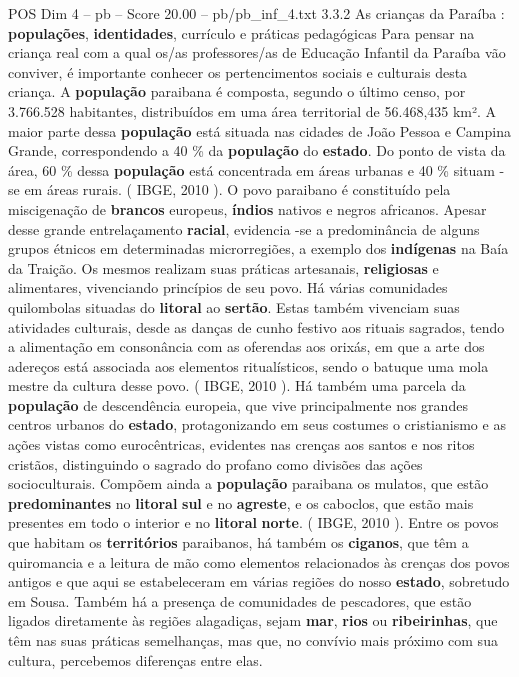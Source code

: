 \begin{textsample}{POS Dim 4 – pb – Score 20.00 – pb/pb\_inf\_4.txt}  \label{ex:f4_pos_261}
3.3.2 As crianças da Paraíba : \textbf{populações}, \textbf{identidades}, currículo e práticas pedagógicas Para pensar na criança real com a qual os/as professores/as de Educação Infantil da Paraíba vão conviver, é importante conhecer os pertencimentos sociais e culturais desta criança.
A \textbf{população} paraibana é composta, segundo o último censo, por 3.766.528 habitantes, distribuídos em uma área territorial de 56.468,435 km².
A maior parte dessa \textbf{população} está situada nas cidades de João Pessoa e Campina Grande, correspondendo a 40 \% da \textbf{população} do \textbf{estado}.
Do ponto de vista da área, 60 \% dessa \textbf{população} está concentrada em áreas urbanas e 40 \% situam -se em áreas rurais. ( IBGE, 2010 ).
O povo paraibano é constituído pela miscigenação de \textbf{brancos} europeus, \textbf{índios} nativos e negros africanos.
Apesar desse grande entrelaçamento \textbf{racial}, evidencia -se a predominância de alguns grupos étnicos em determinadas microrregiões, a exemplo dos \textbf{indígenas} na Baía da Traição.
Os mesmos realizam suas práticas artesanais, \textbf{religiosas} e alimentares, vivenciando princípios de seu povo.
Há várias comunidades quilombolas situadas do \textbf{litoral} ao \textbf{sertão}.
Estas também vivenciam suas atividades culturais, desde as danças de cunho festivo aos rituais sagrados, tendo a alimentação em consonância com as oferendas aos orixás, em que a arte dos adereços está associada aos elementos ritualísticos, sendo o batuque uma mola mestre da cultura desse povo. ( IBGE, 2010 ).
Há também uma parcela da \textbf{população} de descendência europeia, que vive principalmente nos grandes centros urbanos do \textbf{estado}, protagonizando em seus costumes o cristianismo e as ações vistas como eurocêntricas, evidentes nas crenças aos santos e nos ritos cristãos, distinguindo o sagrado do profano como divisões das ações socioculturais.
Compõem ainda a \textbf{população} paraibana os mulatos, que estão \textbf{predominantes} no \textbf{litoral} \textbf{sul} e no \textbf{agreste}, e os caboclos, que estão mais presentes em todo o interior e no \textbf{litoral} \textbf{norte}. ( IBGE, 2010 ).
Entre os povos que habitam os \textbf{territórios} paraibanos, há também os \textbf{ciganos}, que têm a quiromancia e a leitura de mão como elementos relacionados às crenças dos povos antigos e que aqui se estabeleceram em várias regiões do nosso \textbf{estado}, sobretudo em Sousa.
Também há a presença de comunidades de pescadores, que estão ligados diretamente às regiões alagadiças, sejam \textbf{mar}, \textbf{rios} ou \textbf{ribeirinhas}, que têm nas suas práticas semelhanças, mas que, no convívio mais próximo com sua cultura, percebemos diferenças entre elas.

\end{textsample}
